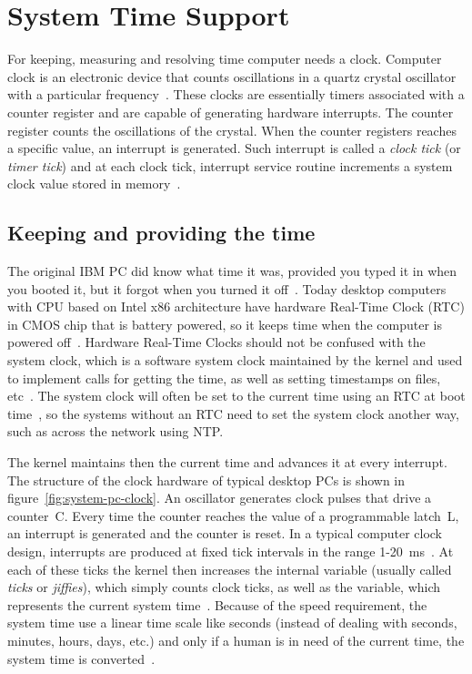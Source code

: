 
\chapter{System Time Support}
For keeping, measuring and resolving time computer needs a clock.
Computer clock is an electronic device that counts oscillations in a
quartz crystal oscillator with a particular frequency~\cite{thesis-sync}.
These clocks are essentially timers associated with a counter register and
are capable of generating hardware interrupts.
The counter register counts the oscillations of the crystal.
When the counter registers reaches a specific value,
an interrupt is generated.
Such interrupt is called a {\it{clock tick}} (or {\it{timer tick}}) and at each clock tick,
interrupt service routine increments a system clock value stored in memory~\cite{thesis-sync}.

\section{Keeping and providing the time}\label{sec:system-keeping-and-providing}
The original IBM PC did know what time it was, provided you typed it in when you booted it,
but it forgot when you turned it off~\cite{timecounters}.
Today desktop computers with CPU based on Intel x86 architecture
have hardware Real-Time Clock (RTC) in CMOS chip that is battery powered,
so it keeps time when the computer is powered off~\cite{timecounters}.
Hardware Real-Time Clocks should not be confused with the system clock,
which is a software system clock maintained by
the kernel and used to implement calls for getting the time,
as well as setting timestamps on files, etc~\cite{linux-man-rtc}.
The system clock will often be set to the current time using an RTC at boot time~\cite{linux-man-rtc},
so the systems without an RTC need to set the system clock another way,
such as across the network using NTP.

The kernel maintains then the current time and advances it at every interrupt.
The structure of the clock hardware of
typical desktop PCs is shown in figure~\ref{fig:system-pc-clock}.
An oscillator generates clock pulses that drive a counter~C.
Every time the counter reaches the value of a programmable latch~L,
an interrupt is generated and the counter is reset.
In a typical computer clock design, interrupts are produced at
fixed tick intervals in the range 1-20~ms~\cite{nanokernel}.
At each of these ticks the kernel then increases the internal variable
(usually called {\it{ticks}} or {\it{jiffies}}), which simply counts clock ticks,
as well as the variable, which represents the current system time~\cite{thesis-beat}.
Because of the speed requirement,
the system time use a linear time scale like seconds
(instead of dealing with seconds, minutes, hours, days, etc.)
and only if a human is in need of the current time,
the system time is converted~\cite{ntp-faq}.

